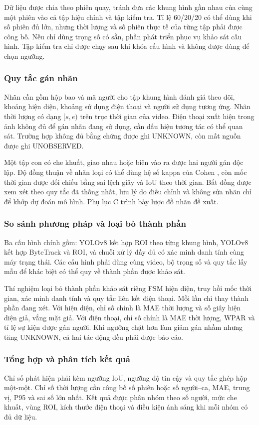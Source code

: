 Dữ liệu được chia theo phiên quay, tránh đưa các khung hình gần nhau của cùng một phiên vào cả tập hiệu chỉnh và tập kiểm tra. Tỉ lệ 60/20/20 có thể dùng khi số phiên đủ lớn, nhưng thời lượng và số phiên thực tế của từng tập phải được công bố. Nếu chỉ dùng trọng số có sẵn, phần phát triển phục vụ khảo sát cấu hình. Tập kiểm tra chỉ được chạy sau khi khóa cấu hình và không được dùng để chọn ngưỡng.

\subsubsection{Quy tắc gán nhãn}
Nhãn cần gồm hộp bao và mã người cho tập khung hình đánh giá theo dõi, khoảng hiện diện, khoảng sử dụng điện thoại và người sử dụng tương ứng. Nhãn thời lượng có dạng $[s,e)$ trên trục thời gian của video. Điện thoại xuất hiện trong ảnh không đủ để gán nhãn đang sử dụng, cần dấu hiệu tương tác có thể quan sát. Trường hợp không đủ bằng chứng được ghi UNKNOWN, còn mất nguồn được ghi UNOBSERVED.

Một tập con có che khuất, giao nhau hoặc biên vào ra được hai người gán độc lập. Độ đồng thuận về nhãn loại có thể dùng hệ số kappa của Cohen \cite{cohen}, còn mốc thời gian được đối chiếu bằng sai lệch giây và IoU theo thời gian. Bất đồng được xem xét theo quy tắc đã thống nhất, lưu lý do điều chỉnh và không sửa nhãn chỉ để khớp dự đoán mô hình. Phụ lục C trình bày lược đồ nhãn đề xuất.

\subsubsection{So sánh phương pháp và loại bỏ thành phần}
Ba cấu hình chính gồm: YOLOv8 kết hợp ROI theo từng khung hình, YOLOv8 kết hợp ByteTrack và ROI, và chuỗi xử lý đầy đủ có xác minh danh tính cùng máy trạng thái. Các cấu hình phải dùng cùng video, bộ trọng số và quy tắc lấy mẫu để khác biệt có thể quy về thành phần được khảo sát.

Thí nghiệm loại bỏ thành phần khảo sát riêng FSM hiện diện, truy hồi mốc thời gian, xác minh danh tính và quy tắc liên kết điện thoại. Mỗi lần chỉ thay thành phần đang xét. Với hiện diện, chỉ số chính là MAE thời lượng và số giây hiện diện giả, vắng mặt giả. Với điện thoại, chỉ số chính là MAE thời lượng, WPAR và tỉ lệ sự kiện được gán người. Khi ngưỡng chặt hơn làm giảm gán nhầm nhưng tăng UNKNOWN, cả hai tác động đều phải được báo cáo.

\subsubsection{Tổng hợp và phân tích kết quả}
Chỉ số phát hiện phải kèm ngưỡng IoU, ngưỡng độ tin cậy và quy tắc ghép hộp một-một. Chỉ số thời lượng cần công bố số phiên hoặc số người--ca, MAE, trung vị, P95 và sai số lớn nhất. Kết quả được phân nhóm theo số người, mức che khuất, vùng ROI, kích thước điện thoại và điều kiện ánh sáng khi mỗi nhóm có đủ dữ liệu.

